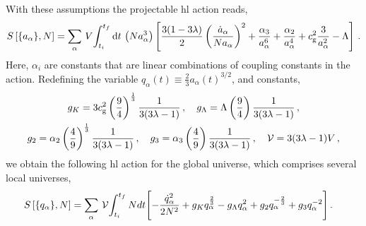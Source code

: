 \documentclass[superscriptaddress,aps,preprintnumbers,nofootinbib]{revtex4-2}
\begin{document}
With these assumptions the projectable \ac{hl} action reads, 
\begin{equation} \label{eq:HLaction-FLRW}
        S\left[\{a_{\alpha}\},N\right] =  \sum_{\alpha}\, V\!\int_{t_i}^{t_f} \mathrm{d} t\, 
        \left({Na_{\alpha}^3}\right) \left[
              \frac{3(1-3\lambda)}{2}\left(\frac{\dot{a}_{\alpha}}{Na_{\alpha}}\right)^{2}
              + \frac{\alpha_3}{a^6_{\alpha}}+\frac{\alpha_2}{a^4_{\alpha}}+c_{\rm g}^2
        \frac{3}{a^2_{\alpha}}-\Lambda \right]\,. 
\end{equation}
Here, $\alpha_i$ are constants that are linear combinations of coupling constants in the action. Redefining the variable $q_{\alpha}(t) \equiv \frac{2}{3}a_{\alpha}(t)^{3/2}$, and constants,
\begin{equation}
    \begin{gathered}
        g_K = 3c_{\rm g}^2\left(\frac{9}{4}\right)^{\frac{1}{3}}
 \frac{1}{3(3\lambda-1)} \,, \quad
            g_{\Lambda} = \Lambda\left(\frac{9}{4}\right)
             \frac{1}{3(3\lambda-1)} \,, \\
            g_2 = \alpha_{2}\left(\frac{4}{9}\right)^{\frac{1}{3}}
 \frac{1}{3(3\lambda-1)} \,,\quad
            g_3 = \alpha_{3}\left(\frac{4}{9}\right)
 \frac{1}{3(3\lambda-1)}\,,\quad  {\cal V}=3(3\lambda-1)V\,,
    \end{gathered}
\end{equation}
we obtain the following \ac{hl} action for the global universe, which comprises several local
universes, 
\begin{align}
S\left[\{q_{\alpha}\},N\right]
 &=\sum_{\alpha}\, {\cal V}\!\int_{t_i}^{t_f}Ndt \Biggl[-\frac{\dot{q}_{\alpha}^2}{2N^2}
 +g_Kq_{\alpha}^{\frac{2}{3}}
 -g_{\Lambda}q_{\alpha}^{2} +g_{2}q_{\alpha}^{-\frac{2}{3}}+g_{3}q_{\alpha}^{-2}\Biggr]\,. 
\end{align}
\end{document}
